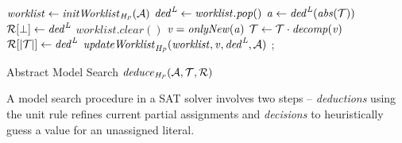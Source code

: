 \begin{algorithm2e}[t]
\DontPrintSemicolon
{}
\begin{small}
$\mathit{worklist} \leftarrow \mathit{initWorklist}_{\mathit{H_P}}(\mathcal{A})$ \;
{
  $\mathit{ded}^{\mathit{L}} \leftarrow \mathit{worklist.pop}()$ \; 
  $\mathit{a} \leftarrow \mathit{ded}^{\mathit{L}}(\mathit{abs}(\mathcal{T}))$\;
  \uIf{$\absval = \bot$} {
    $\mathcal{R}[\bot] \leftarrow \mathit{ded}^{\mathit{L}}$ \;
    $\mathit{worklist.clear}()$ \;
    \return \conflict \;
  }
  \uElse
  {
    $\mathit{v}=\mathit{onlyNew}(\mathit{a})$\;
    $\mathcal{T} \leftarrow \mathcal{T} \cdot {\mathit{decomp}}(\mathit{v})$ \; 
    $\mathcal{R}[|\mathcal{T}|] \leftarrow \mathit{ded}^{\mathit{L}}$ \;
    $\mathit{updateWorklist}_{\mathit{H_P}}(\mathit{worklist}, \mathit{v}, \mathit{ded}^{\mathit{L}},  \mathcal{A})$ \; 
  }
}
 {
  \return \sat;
}
 \return \unknown \;

\end{small}
\caption{Abstract Model Search $\mathit{deduce}_{\mathit{H_P}}(\mathcal{A},\mathcal{T},\mathcal{R})$ \label{Alg:ms}}
\end{algorithm2e}
%  
A model search procedure in a SAT solver involves two steps -- {\em deductions} 
using the unit rule refines current partial assignments and 
{\em decisions} to heuristically guess a value for an unassigned 
literal.  
%

